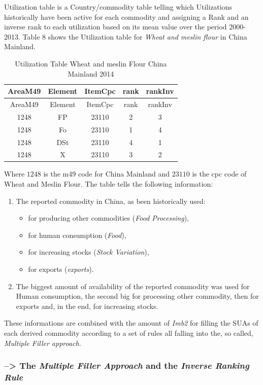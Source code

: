 \documentclass[]{article}
\providecommand{\tightlist}{%
  \setlength{\itemsep}{0pt}\setlength{\parskip}{0pt}}
\begin{document}
Utilization table is a Country/commodity table telling which
Utilizations historically have been active for each commodity and
assigning a Rank and an inverse rank to each utilization based on its
mean value over the period 2000-2013. Table 8 shows the Utilization
table for \emph{Wheat and meslin flour} in China Mainland.

\begin{longtable}[]{@{}ccccc@{}}
\caption{Utilization Table Wheat and meslin Flour China Mainland
2014}\tabularnewline
\toprule
AreaM49 & Element & ItemCpc & rank & rankInv\tabularnewline
\midrule
\endfirsthead
\toprule
AreaM49 & Element & ItemCpc & rank & rankInv\tabularnewline
\midrule
\endhead
1248 & FP & 23110 & 2 & 3\tabularnewline
1248 & Fo & 23110 & 1 & 4\tabularnewline
1248 & DSt & 23110 & 4 & 1\tabularnewline
1248 & X & 23110 & 3 & 2\tabularnewline
\bottomrule
\end{longtable}

Where \(1248\) is the m49 code for China Mainland and \(23110\) is the
cpc code of Wheat and Meslin Flour. The table tells the following
information:

\begin{enumerate}
\def\labelenumi{\arabic{enumi}.}
\tightlist
\item
  The reported commodity in China, as been historically used:

  \begin{itemize}
  \tightlist
  \item
    for producing other commodities (\emph{Food Processing}),
  \item
    for human consumption (\emph{Food}),
  \item
    for increasing stocks (\emph{Stock Variation}),
  \item
    for exports (\emph{exports}).
  \end{itemize}
\item
  The biggest amount of availability of the reported commodity was used
  for Human consumption, the second big for processing other commodity,
  then for exports and, in the end, for increasing stocks.
\end{enumerate}

These informations are combined with the amount of \emph{Imb2} for
filling the SUAs of each derived commodity according to a set of rules
all falling into the, so called, \emph{Multiple Filler approach}.

\subsubsection*{\texorpdfstring{--\textgreater{} The \emph{Multiple
Filler Approach} and the \emph{Inverse Ranking
Rule}}{--\textgreater{} The Multiple Filler Approach and the Inverse Ranking Rule}}\label{the-multiple-filler-approach-and-the-inverse-ranking-rule}
\end{document}
